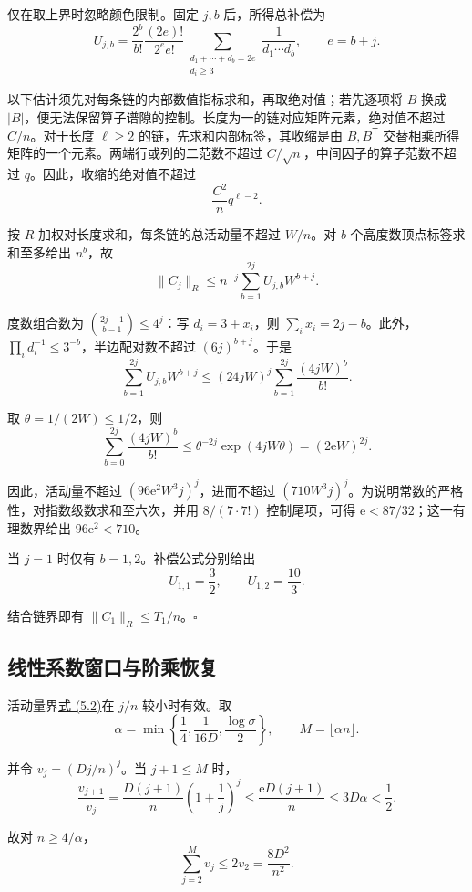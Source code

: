 \documentclass[11pt,a4paper]{article}
\newcommand{\paperref}[2]{\hyperref[#1]{#2}}
\begin{document}
仅在取上界时忽略颜色限制。固定 \(j,b\) 后，所得总补偿为
\[U_{j,b}=
\frac{2^b}{b!}\frac{(2e)!}{2^e e!}
\sum_{\substack{d_1+\cdots+d_b=2e\\d_i\ge3}}
\frac1{d_1\cdots d_b},
\qquad e=b+j.\]

以下估计须先对每条链的内部数值指标求和，再取绝对值；若先逐项将 \(B\) 换成 \(|B|\)，便无法保留算子谱隙的控制。长度为一的链对应矩阵元素，绝对值不超过 \(C/n\)。对于长度 \(\ell\ge2\) 的链，先求和内部标签，其收缩是由 \(B,B^{\mathsf T}\) 交替相乘所得矩阵的一个元素。两端行或列的二范数不超过 \(C/\sqrt n\)，中间因子的算子范数不超过 \(q\)。因此，收缩的绝对值不超过
\[\frac{C^2}{n}q^{\ell-2}.\]

按 \(R\) 加权对长度求和，每条链的总活动量不超过 \(W/n\)。对 \(b\) 个高度数顶点标签求和至多给出 \(n^b\)，故
\[\|C_j\|_R\le n^{-j}
\sum_{b=1}^{2j}U_{j,b}W^{b+j}.\]

度数组合数为 \(\binom{2j-1}{b-1}\le4^j\)：写 \(d_i=3+x_i\)，则 \(\sum_i x_i=2j-b\)。此外，\(\prod_i d_i^{-1}\le3^{-b}\)，半边配对数不超过 \((6j)^{b+j}\)。于是
\[\sum_{b=1}^{2j}U_{j,b}W^{b+j}
\le(24jW)^j
\sum_{b=1}^{2j}\frac{(4jW)^b}{b!}.\]

取 \(\theta=1/(2W)\le1/2\)，则
\[\sum_{b=0}^{2j}\frac{(4jW)^b}{b!}
\le\theta^{-2j}\exp(4jW\theta)
=(2\mathrm e W)^{2j}.\]

因此，活动量不超过 \((96\mathrm e^2W^3j)^j\)，进而不超过 \((710W^3j)^j\)。为说明常数的严格性，对指数级数求和至六次，并用 \(8/(7\cdot7!)\) 控制尾项，可得 \(\mathrm e<87/32\)；这一有理数界给出 \(96\mathrm e^2<710\)。

当 \(j=1\) 时仅有 \(b=1,2\)。补偿公式分别给出
\[U_{1,1}=\frac32,\qquad U_{1,2}=\frac{10}{3}.\]

结合链界即有 \(\|C_1\|_R\le T_1/n\)。\nobreak\hspace{.5em}\mbox{$\square$}

\subsection{线性系数窗口与阶乘恢复}\label{sec-5.4}

活动量界\paperref{eq-core-activity}{式 (5.2)}在 \(j/n\) 较小时有效。取
\[\alpha=\min\left\{\frac14,\frac1{16D},\frac{\log\sigma}{2}\right\},
\qquad M=\lfloor\alpha n\rfloor.\]

并令 \(v_j=(Dj/n)^j\)。当 \(j+1\le M\) 时，
\[\frac{v_{j+1}}{v_j}
=\frac{D(j+1)}n\left(1+\frac1j\right)^j
\le\frac{\mathrm e D(j+1)}n
\le3D\alpha<\frac12.\]

故对 \(n\ge4/\alpha\)，
\[\sum_{j=2}^{M}v_j\le2v_2=\frac{8D^2}{n^2}.\]
\end{document}
